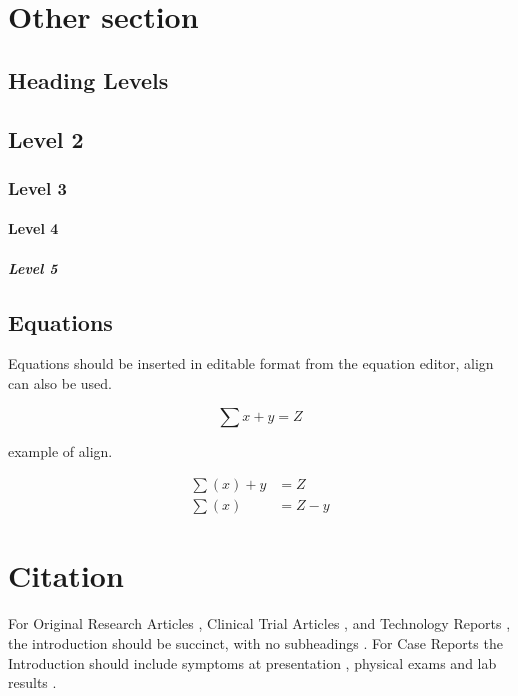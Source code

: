 \documentclass[utf8]{ReportTERRA}
\begin{document}
\section{Other section}
\lipsum[5-6]

\subsection{Heading Levels}


\subsection{Level 2}
\subsubsection{Level 3}
\paragraph{Level 4}
\subparagraph{Level 5}

\subsection{Equations}
Equations should be inserted in editable format from the equation editor, align can also be used.

\begin{equation}
\sum x+ y =Z\label{eq:01}
\end{equation}

example of align.

\begin{align}
\sum (x) + y &= Z\label{eq:02}\\
\sum (x) &= Z - y\label{eq:03}
\end{align}



\section{Citation}

For Original Research Articles \citep{conference}, Clinical Trial Articles \citep{article}, and Technology Reports \citep{patent}, the introduction should be succinct, with no subheadings \citep{book}. For Case Reports the Introduction should include symptoms at presentation \citep{chapter}, physical exams and lab results \citep{dataset}.
\end{document}
